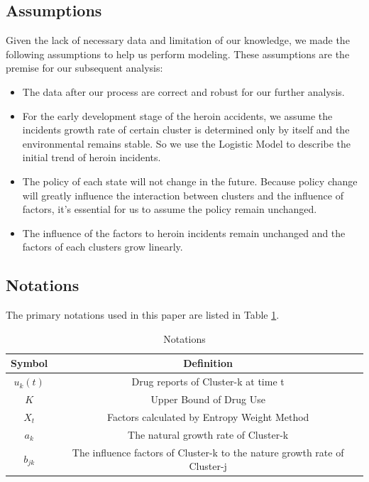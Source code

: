 \documentclass[12pt]{article}
\begin{document}
\subsection{Assumptions}
Given the lack of necessary data and limitation of our knowledge, we made the following assumptions to help us perform modeling. These assumptions are the premise for our subsequent analysis:
\begin{itemize}
	\item The data after our process are correct and robust for our further analysis.
	\item For the early development stage of the heroin accidents, we assume the incidents growth rate of certain cluster is determined only by itself and the environmental remains stable. So we use the Logistic Model to describe the initial trend of heroin incidents.
	\item The policy of each state will not change in the future. Because policy change will greatly influence the interaction between clusters and the influence of factors, it's essential for us to assume the policy remain unchanged.
	\item The influence of the factors to heroin incidents remain unchanged and the factors of each clusters grow linearly.
\end{itemize}

\subsection{Notations}
The primary notations used in this paper are listed in Table \ref{tb:notation}.
\begin{table}[!htbp]
\small
\begin{center}
\caption{Notations}
\begin{tabular}{cc}
	\toprule
	\multicolumn{1}{m{3cm}}{\centering Symbol}
	&\multicolumn{1}{m{8cm}}{\centering Definition}\\
	\midrule
	$u_{k}(t)$ &Drug reports of Cluster-k at time t\\
	$ K $ & Upper Bound of Drug Use \\
	$X_{t}$ & Factors calculated by Entropy Weight Method\\
	$a_{k}$ & The natural growth rate of Cluster-k\\
	$b_{jk}$ & The influence factors of Cluster-k to the nature growth rate of Cluster-j\\
	\bottomrule
\end{tabular}\label{tb:notation}
\end{center}
\end{table}
\end{document}
